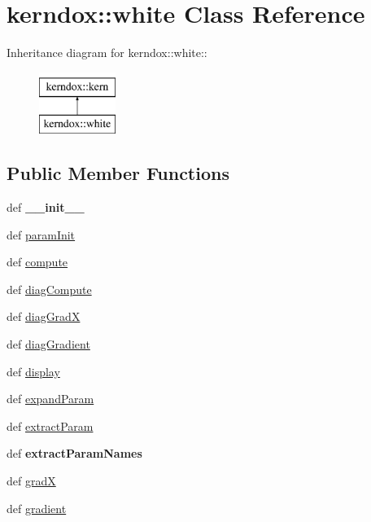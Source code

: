 \hypertarget{classkerndox_1_1white}{
\section{kerndox::white Class Reference}
\label{classkerndox_1_1white}
}
Inheritance diagram for kerndox::white::\begin{figure}[H]
\begin{center}
\leavevmode
\includegraphics[height=2cm]{classkerndox_1_1white}
\end{center}
\end{figure}
\subsection*{Public Member Functions}
\begin{CompactItemize}
\item 
\hypertarget{classkerndox_1_1white_6962fe7a0c4cf91a9bdd44bedaf6bad9}{
def \textbf{\_\-\_\-init\_\-\_\-}}
\label{classkerndox_1_1white_6962fe7a0c4cf91a9bdd44bedaf6bad9}

\item 
def \hyperlink{classkerndox_1_1white_a20868e9e4488b9d80a70bf2e67b1438}{paramInit}
\item 
def \hyperlink{classkerndox_1_1white_805a650c553ae690536aa1000a2250e9}{compute}
\item 
def \hyperlink{classkerndox_1_1white_857c95585d0e30876382adacf58b52c2}{diagCompute}
\item 
def \hyperlink{classkerndox_1_1white_b0eee0d7ea27e278d7d39952053db3fc}{diagGradX}
\item 
def \hyperlink{classkerndox_1_1white_2f32c7f63de971d57148ab933073a791}{diagGradient}
\item 
def \hyperlink{classkerndox_1_1white_116d1d61e0eeee8609c876dba99a05d9}{display}
\item 
def \hyperlink{classkerndox_1_1white_ffc20aaa72aee2a83c2a57e70a67bce0}{expandParam}
\item 
def \hyperlink{classkerndox_1_1white_f4e9339bff592a00757fdd2f5bf6627a}{extractParam}
\item 
\hypertarget{classkerndox_1_1white_992a23fe6ed4b0600243ab4e0caa5a99}{
def \textbf{extractParamNames}}
\label{classkerndox_1_1white_992a23fe6ed4b0600243ab4e0caa5a99}

\item 
def \hyperlink{classkerndox_1_1white_b03d95c89f8e460fe5b1e8a97661e15c}{gradX}
\item 
def \hyperlink{classkerndox_1_1white_21428889944fc4070648f5d36f7c30a7}{gradient}
\end{CompactItemize}
